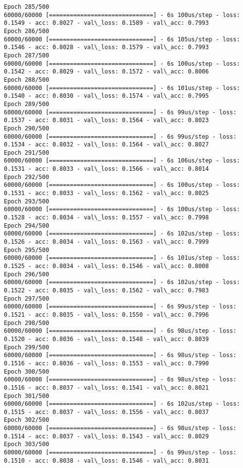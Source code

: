 \documentclass[11pt]{article}
\begin{document}
\begin{Verbatim}[commandchars=\\\{\}]
Epoch 285/500
60000/60000 [==============================] - 6s 100us/step - loss: 0.1549 - acc: 0.8027 - val\_loss: 0.1589 - val\_acc: 0.7993
Epoch 286/500
60000/60000 [==============================] - 6s 105us/step - loss: 0.1546 - acc: 0.8028 - val\_loss: 0.1579 - val\_acc: 0.7993
Epoch 287/500
60000/60000 [==============================] - 6s 100us/step - loss: 0.1542 - acc: 0.8029 - val\_loss: 0.1572 - val\_acc: 0.8006
Epoch 288/500
60000/60000 [==============================] - 6s 101us/step - loss: 0.1540 - acc: 0.8030 - val\_loss: 0.1574 - val\_acc: 0.7995
Epoch 289/500
60000/60000 [==============================] - 6s 99us/step - loss: 0.1537 - acc: 0.8031 - val\_loss: 0.1564 - val\_acc: 0.8023
Epoch 290/500
60000/60000 [==============================] - 6s 99us/step - loss: 0.1534 - acc: 0.8032 - val\_loss: 0.1564 - val\_acc: 0.8027
Epoch 291/500
60000/60000 [==============================] - 6s 106us/step - loss: 0.1531 - acc: 0.8033 - val\_loss: 0.1566 - val\_acc: 0.8014
Epoch 292/500
60000/60000 [==============================] - 6s 100us/step - loss: 0.1531 - acc: 0.8033 - val\_loss: 0.1562 - val\_acc: 0.8025
Epoch 293/500
60000/60000 [==============================] - 6s 100us/step - loss: 0.1528 - acc: 0.8034 - val\_loss: 0.1557 - val\_acc: 0.7998
Epoch 294/500
60000/60000 [==============================] - 6s 102us/step - loss: 0.1526 - acc: 0.8034 - val\_loss: 0.1563 - val\_acc: 0.7999
Epoch 295/500
60000/60000 [==============================] - 6s 101us/step - loss: 0.1525 - acc: 0.8034 - val\_loss: 0.1546 - val\_acc: 0.8008
Epoch 296/500
60000/60000 [==============================] - 6s 102us/step - loss: 0.1522 - acc: 0.8035 - val\_loss: 0.1562 - val\_acc: 0.7983
Epoch 297/500
60000/60000 [==============================] - 6s 99us/step - loss: 0.1521 - acc: 0.8035 - val\_loss: 0.1550 - val\_acc: 0.7996
Epoch 298/500
60000/60000 [==============================] - 6s 98us/step - loss: 0.1520 - acc: 0.8036 - val\_loss: 0.1548 - val\_acc: 0.8039
Epoch 299/500
60000/60000 [==============================] - 6s 98us/step - loss: 0.1516 - acc: 0.8036 - val\_loss: 0.1553 - val\_acc: 0.7990
Epoch 300/500
60000/60000 [==============================] - 6s 98us/step - loss: 0.1516 - acc: 0.8037 - val\_loss: 0.1541 - val\_acc: 0.8021
Epoch 301/500
60000/60000 [==============================] - 6s 102us/step - loss: 0.1515 - acc: 0.8037 - val\_loss: 0.1556 - val\_acc: 0.8037
Epoch 302/500
60000/60000 [==============================] - 6s 98us/step - loss: 0.1514 - acc: 0.8037 - val\_loss: 0.1543 - val\_acc: 0.8029
Epoch 303/500
60000/60000 [==============================] - 6s 99us/step - loss: 0.1510 - acc: 0.8038 - val\_loss: 0.1546 - val\_acc: 0.8031

\end{Verbatim}
\end{document}
